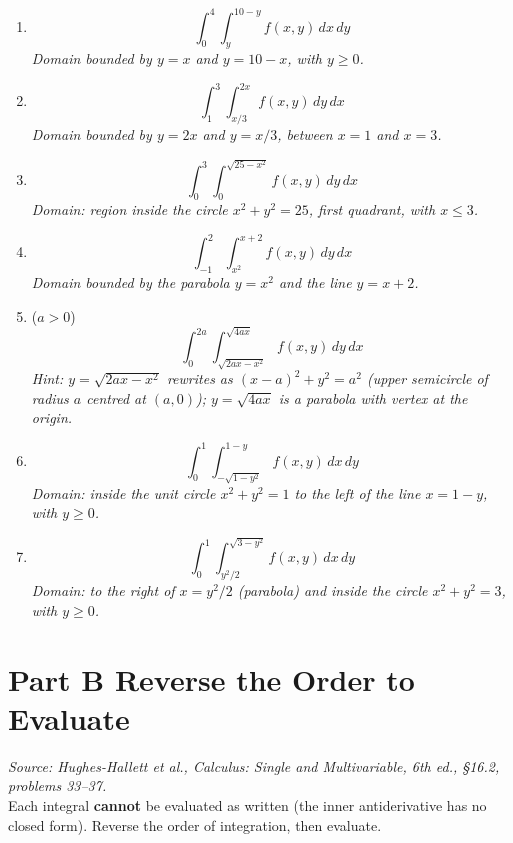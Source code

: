 \documentclass[12pt]{article}
\begin{document}
\begin{enumerate}[label=\textbf{A\arabic*.}, leftmargin=*, itemsep=18pt]

\item %
\[
  \int_0^{4} \int_{y}^{10-y} f(x,y)\,dx\,dy
\]
\textit{Domain bounded by $y = x$ and $y = 10-x$, with $y \ge 0$.}

\item %
\[
  \int_1^{3} \int_{x/3}^{2x} f(x,y)\,dy\,dx
\]
\textit{Domain bounded by $y = 2x$ and $y = x/3$, between $x=1$ and $x=3$.}

\item %
\[
  \int_0^{3} \int_0^{\sqrt{25-x^2}} f(x,y)\,dy\,dx
\]
\textit{Domain: region inside the circle $x^2+y^2=25$, first quadrant, with $x \le 3$.}

\item %
\[
  \int_{-1}^{2} \int_{x^2}^{x+2} f(x,y)\,dy\,dx
\]
\textit{Domain bounded by the parabola $y = x^2$ and the line $y = x+2$.}

\item %
($a > 0$)\;
\[
  \int_0^{2a} \int_{\sqrt{2ax-x^2}}^{\sqrt{4ax}} f(x,y)\,dy\,dx
\]
\textit{Hint: $y = \sqrt{2ax - x^2}$ rewrites as $(x-a)^2 + y^2 = a^2$ (upper semicircle of radius $a$ centred at $(a,0)$); $y = \sqrt{4ax}$ is a parabola with vertex at the origin.}

\item %
\[
  \int_0^{1} \int_{-\sqrt{1-y^2}}^{1-y} f(x,y)\,dx\,dy
\]
\textit{Domain: inside the unit circle $x^2+y^2=1$ to the left of the line $x = 1-y$, with $y \ge 0$.}

\item %
\[
  \int_0^{1} \int_{y^2/2}^{\sqrt{3-y^2}} f(x,y)\,dx\,dy
\]
\textit{Domain: to the right of $x = y^2/2$ (parabola) and inside the circle $x^2+y^2=3$, with $y \ge 0$.}

\end{enumerate}

\bigskip
\section*{Part B \quad Reverse the Order to Evaluate}
\textit{Source: Hughes-Hallett et al., \emph{Calculus: Single and Multivariable}, 6th ed., \S16.2, problems 33--37.}\\[4pt]
Each integral \textbf{cannot} be evaluated as written (the inner antiderivative has no closed form).
Reverse the order of integration, then evaluate.
\end{document}
